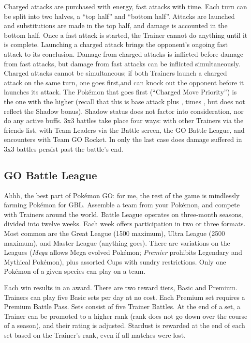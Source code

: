 Charged attacks are purchased with energy, fast attacks with time.
Each turn can be split into two halves, a ``top half'' and ``bottom half''.
Attacks are launched and substitutions are made in the top half, and damage is accounted in the bottom half.
Once a fast attack is started, the Trainer cannot do anything until it is complete.
Launching a charged attack brings the opponent's ongoing fast attack to its conclusion.
Damage from charged attacks is inflicted before damage from fast attacks,
  but damage from fast attacks can be inflicted simultaneously.
Charged attacks cannot be simultaneous; if both Trainers launch a charged attack
  on the same turn, one goes first,and can knock out the opponent before it
  launches its attack.
The Pokémon that goes first (``Charged Move Priority'') is the one with the
  higher  (recall that this is base attack plus , times \CPM, but does not reflect the Shadow bonus).
Shadow status does not factor into consideration, nor do any active buffs.
3x3 battles take place four ways: with other Trainers via the friends list,
 with Team Leaders via the Battle screen, the GO Battle League,
 and encounters with Team GO Rocket.
In only the last case does damage suffered in 3x3 battles persist past the battle's end.

\subsection{GO Battle League\label{subsec:league}}
Ahhh, the best part of Pokémon GO: for me, the rest of the game is mindlessly farming Pokémon for GBL.
Assemble a team from your Pokémon, and compete with Trainers around the world.
Battle League operates on three-month seasons, divided into twelve weeks.
Each week offers participation in two or three formats.
Most common are the Great League (1500 \CP{} maximum), Ultra League (2500 \CP{} maximum),
 and Master League (anything goes).
There are variations on the Leagues (\textit{Mega} allows Mega evolved Pokémon;
 \textit{Premier} prohibits Legendary and Mythical Pokémon),
 plus assorted Cups with sundry restrictions.
Only one Pokémon of a given species can play on a team.

Each win results in an award.
There are two reward tiers, Basic and Premium.
Trainers can play five Basic sets per day at no cost.
Each Premium set requires a Premium Battle Pass.
Sets consist of five Trainer Battles.
At the end of a set, a Trainer can be promoted to a higher rank (rank does not
 go down over the course of a season), and their rating is adjusted.
Stardust is rewarded at the end of each set based on the Trainer's rank,
 even if all matches were lost.

